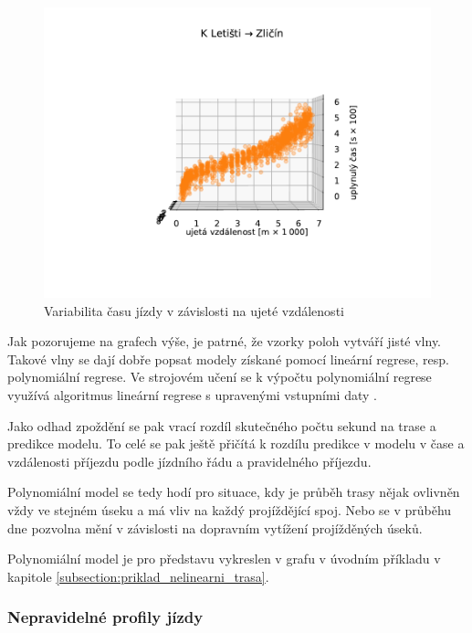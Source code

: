 \begin{figure}
\centering
  \includegraphics[width=\linewidth]{../img/dojezd_podle_vzdalenosti}
  \caption{Variabilita času jízdy v závislosti na ujeté vzdálenosti}
  \label{fig:dojezd_podle_vzdalenosti}
\end{figure}


Jak pozorujeme na grafech výše, je patrné, že vzorky poloh vytváří jisté vlny. Takové vlny se dají dobře popsat modely získané pomocí lineární regrese, resp. polynomiální regrese. Ve strojovém učení se k výpočtu polynomiální regrese využívá algoritmus lineární regrese s upravenými vstupními daty \citep[viz][Strany 265--268]{Gareth13}.


\bigbreak


Jako odhad zpoždění se pak vrací rozdíl skutečného počtu sekund na trase a predikce modelu. To celé se pak ještě přičítá k rozdílu predikce v modelu v čase a vzdálenosti příjezdu podle jízdního řádu a pravidelného příjezdu.


\bigbreak


Polynomiální model se tedy hodí pro situace, kdy je průběh trasy nějak ovlivněn vždy ve stejném úseku a má vliv na každý projíždějící spoj. Nebo se v průběhu dne pozvolna mění v závislosti na dopravním vytížení projížděných úseků.


Polynomiální model je pro představu vykreslen v grafu v úvodním příkladu v kapitole \ref{subsection:priklad_nelinearni_trasa}.


\subsubsection{Nepravidelné profily jízdy}


